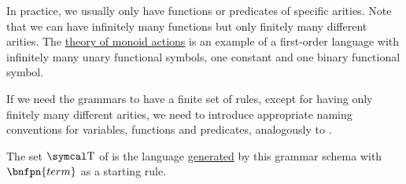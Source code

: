 \begin{definition}
\begin{DefEnum}
\begin{bnf*}
      \bnfmore                  {\hspace{3cm} \vdots} \\
        {\bnfts{\( \top \)} \bnfor \bnfts{\( \bot \)} \bnfor} \\
       \\
       \\
      \bnfmore                  {\hspace{3cm} \vdots} \\
       \\
      \bnfmore                  {\hspace{3cm} \vdots} \\
               { \bnfor} \\
       \\
       \\
    \end{bnf*}

    In practice, we usually only have functions or predicates of specific arities. Note that we can have infinitely many functions but only finitely many different arities. The \hyperref[remark:theory_of_left_monoid_actions]{theory of monoid actions} is an example of a first-order language with infinitely many unary functional symbols, one constant and one binary functional symbol.

    If we need the grammars to have a finite set of rules, except for having only finitely many different arities, we need to introduce appropriate naming conventions for variables, functions and predicates, analogously to .

    The set \( \CT \) of  is the language \hyperref[def:grammar_derivation/grammar_language]{generated} by this grammar schema with \( \bnfpn{term} \) as a starting rule.


\end{DefEnum}
\end{definition}
